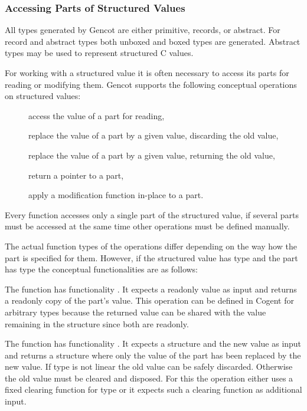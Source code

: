 \subsubsection{Accessing Parts of Structured Values}

All types generated by Gencot are either primitive, records, or abstract. For record and abstract types both 
unboxed and boxed types are generated. Abstract types may be used to represent structured C values.

For working with a structured value it is often necessary to access its parts for reading or modifying them.
Gencot supports the following conceptual operations on structured values:
\begin{description}
  \item[] access the value of a part for reading,
  \item[] replace the value of a part by a given value, discarding the old value,
  \item[] replace the value of a part by a given value, returning the old value,
  \item[] return a pointer to a part,
  \item[] apply a modification function in-place to a part.
\end{description}

Every function accesses only a single part of the structured value, if several parts must be accessed at the same
time other operations must be defined manually.

The actual function types of the operations differ depending on the way how the part is specified for them.
However, if the structured value has type  and the part has type  the conceptual functionalities 
are as follows:

The function  has functionality . It expects a readonly value as input and returns
a readonly copy of the part's value. This operation can be defined in Cogent for arbitrary types 
because the returned value can be shared with the value remaining in the structure since both are readonly.

The function  has functionality . It expects a structure and the new value as input
and returns a structure where only the value of the part has been replaced by the new value. If type 
is not linear the old value can be safely discarded. Otherwise the old value must be cleared and disposed.
For this the operation either uses a fixed clearing function for type  or it expects such a clearing
function as additional input.

